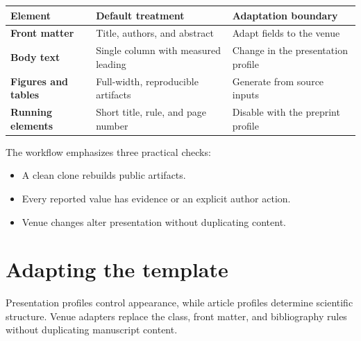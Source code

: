 \documentclass[11pt]{article}
\begin{document}
\begin{center}
\begin{minipage}{\textwidth}
  \captionsetup{hypcap=false}
  \label{tab:preview-choices}
  \begin{tabularx}{\textwidth}{@{}>{\sffamily\bfseries\RaggedRight{}\arraybackslash}p{}YY@{}}
    \toprule
    Element & Default treatment & Adaptation boundary \\
    \midrule
    Front matter & Title, authors, and abstract & Adapt fields to the venue \\
    Body text & Single column with measured leading & Change in the presentation profile \\
    Figures and tables & Full-width, reproducible artifacts & Generate from source inputs \\
    Running elements & Short title, rule, and page number & Disable with the preprint profile \\
    \bottomrule
  \end{tabularx}
\end{minipage}
\end{center}

The workflow emphasizes three practical checks:

\begin{itemize}
  \item A clean clone rebuilds public artifacts.
  \item Every reported value has evidence or an explicit author action.
  \item Venue changes alter presentation without duplicating content.
\end{itemize}

\section{Adapting the template}

Presentation profiles control appearance, while article profiles determine scientific structure.
Venue adapters replace the class, front matter, and bibliography rules without duplicating manuscript content.



\end{document}
